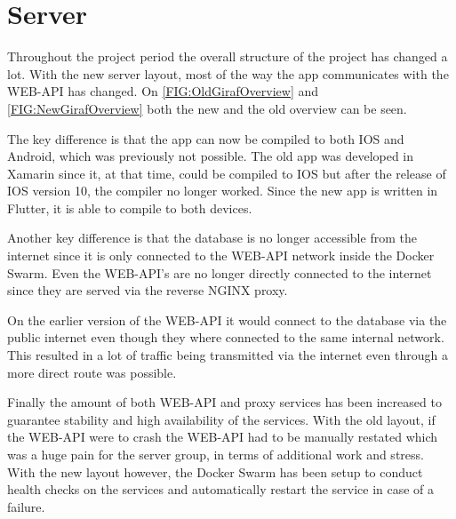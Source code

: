 \section{Server}

Throughout the project period the overall structure of the project has changed a lot. 
With the new server layout, most of the way the app communicates with the WEB-API has changed. 
On \autoref{FIG:OldGirafOverview} and \autoref{FIG:NewGirafOverview} both the new and the old overview can be seen. 

The key difference is that the app can now be compiled to both IOS and Android, which was previously not possible. 
The old app was developed in Xamarin since it, at that time, could be compiled to IOS but after the release of IOS version 10, the compiler no longer worked. 
Since the new app is written in Flutter, it is able to compile to both devices. 


Another key difference is that the database is no longer accessible from the internet since it is only connected to the WEB-API network inside the Docker Swarm. 
Even the WEB-API's are no longer directly connected to the internet since they are served via the reverse NGINX proxy.

On the earlier version of the WEB-API it would connect to the database via the public internet even though they where connected to the same internal network.
This resulted in a lot of traffic being transmitted via the internet even through a more direct route was possible. 


Finally the amount of both WEB-API and proxy services has been increased to guarantee stability and high availability of the services. 
With the old layout, if the WEB-API were to crash the WEB-API had to be manually restated which was a huge pain for the server group, in terms of additional work and stress. 
With the new layout however, the Docker Swarm has been setup to conduct health checks on the services and automatically restart the service in case of a failure.
